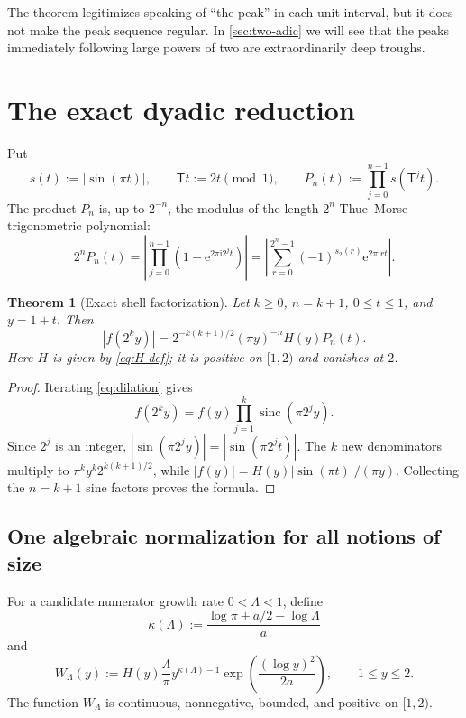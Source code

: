 \documentclass[11pt,oneside]{article}
\newtheorem{theorem}{Theorem}[section]
\theoremstyle{definition}
\theoremstyle{remark}
\newcommand{\e}{\mathrm e}
\newcommand{\ii}{\mathrm i}
\newcommand{\sinc}{\operatorname{sinc}}
\newcommand{\wt}{s_2}
\newcommand{\T}{\mathsf T}
\begin{document}
The theorem legitimizes speaking of ``the peak'' in each unit interval, but it
does not make the peak sequence regular.  In \cref{sec:two-adic} we will see
that the peaks immediately following large powers of two are extraordinarily
deep troughs.

\section{The exact dyadic reduction}
\label{sec:factorization}

Put
\begin{equation}
 s(t):=|\sin(\pi t)|,
 \qquad
 \T t:=2t\pmod1,
 \qquad
 P_n(t):=\prod_{j=0}^{n-1}s(\T^jt).
 \label{eq:Pn}
\end{equation}
The product $P_n$ is, up to $2^{-n}$, the modulus of the length-$2^n$
Thue--Morse trigonometric polynomial:
\begin{equation}
 2^nP_n(t)=
 \left|\prod_{j=0}^{n-1}(1-\e^{2\pi\ii2^jt})\right|
 =\left|\sum_{r=0}^{2^n-1}(-1)^{\wt(r)}\e^{2\pi\ii rt}\right|.
 \label{eq:TM-polynomial}
\end{equation}

\begin{theorem}[Exact shell factorization]
\label{thm:factorization}
Let $k\ge0$, $n=k+1$, $0\le t\le1$, and $y=1+t$.  Then
\begin{equation}
 \boxed{
 |f(2^ky)|
 =2^{-k(k+1)/2}(\pi y)^{-n}H(y)P_n(t).}
 \label{eq:exact-factorization}
\end{equation}
Here $H$ is given by \eqref{eq:H-def}; it is positive on $[1,2)$ and vanishes
at $2$.
\end{theorem}

\begin{proof}
Iterating \eqref{eq:dilation} gives
\[
 f(2^ky)=f(y)\prod_{j=1}^{k}\sinc(\pi2^jy).
\]
Since $2^j$ is an integer,
$|\sin(\pi2^jy)|=|\sin(\pi2^jt)|$.  The $k$ new denominators multiply to
$\pi^ky^k2^{k(k+1)/2}$, while
$|f(y)|=H(y)|\sin(\pi t)|/(\pi y)$.  Collecting the $n=k+1$ sine factors
proves the formula.
\end{proof}

\subsection{One algebraic normalization for all notions of size}

For a candidate numerator growth rate $0<\Lambda<1$, define
\begin{equation}
 \kappa(\Lambda):=
 \frac{\log\pi+a/2-\log\Lambda}{a}
 \label{eq:kappa-Lambda}
\end{equation}
and
\begin{equation}
 W_\Lambda(y):=
 H(y)\frac{\Lambda}{\pi}
 y^{\kappa(\Lambda)-1}
 \exp\!\left(\frac{(\log y)^2}{2a}\right),
 \qquad 1\le y\le2.
 \label{eq:W-Lambda}
\end{equation}
The function $W_\Lambda$ is continuous, nonnegative, bounded, and positive on
$[1,2)$.
\end{document}
